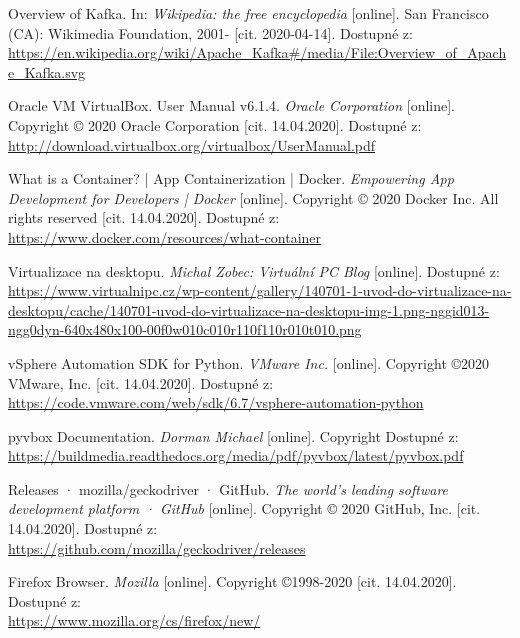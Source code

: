 \documentclass[thesis=M,czech,hidelinks]{FITthesis}[2013/05/06]
\begin{document}
\begin{thebibliography}{9}
	Overview of Kafka. In: \textit{Wikipedia: the free encyclopedia} [online]. San Francisco (CA): Wikimedia Foundation, 2001- [cit. 2020-04-14]. Dostupné z: \\ 
	\url{https://en.wikipedia.org/wiki/Apache_Kafka#/media/File:Overview_of_Apache_Kafka.svg}
	
	Oracle VM VirtualBox. User Manual v6.1.4. \textit{Oracle Corporation} [online]. Copyright © 2020 Oracle Corporation [cit. 14.04.2020]. Dostupné z: \\ 
	\url{http://download.virtualbox.org/virtualbox/UserManual.pdf}
	
	What is a Container? | App Containerization | Docker. \textit{Empowering App Development for Developers | Docker} [online]. Copyright © 2020 Docker Inc. All rights reserved [cit. 14.04.2020]. Dostupné z: \\ 
	\url{https://www.docker.com/resources/what-container}
	
	Virtualizace na desktopu. \textit{Michal Zobec: Virtuální PC Blog} [online]. Dostupné z: \\  
	\url{https://www.virtualnipc.cz/wp-content/gallery/140701-1-uvod-do-virtualizace-na-desktopu/cache/140701-uvod-do-virtualizace-na-desktopu-img-1.png-nggid013-ngg0dyn-640x480x100-00f0w010c010r110f110r010t010.png}
	
	vSphere Automation SDK for Python. \textit{VMware Inc.} [online]. Copyright ©2020 VMware, Inc. [cit. 14.04.2020]. Dostupné z:  \\ 
	\url{https://code.vmware.com/web/sdk/6.7/vsphere-automation-python}
	
	pyvbox Documentation. \textit{Dorman Michael} [online]. Copyright  Dostupné z: \\ 
	\url{https://buildmedia.readthedocs.org/media/pdf/pyvbox/latest/pyvbox.pdf}
	
	Releases · mozilla/geckodriver · GitHub. \textit{The world’s leading software development platform · GitHub} [online]. Copyright © 2020 GitHub, Inc. [cit. 14.04.2020]. Dostupné z:  \\ 
	\url{https://github.com/mozilla/geckodriver/releases}
	
	Firefox Browser. \textit{Mozilla} [online]. Copyright ©1998-2020 [cit. 14.04.2020]. Dostupné z:  \\ 
	\url{https://www.mozilla.org/cs/firefox/new/}
	

\end{thebibliography}
\end{document}
